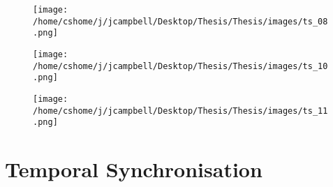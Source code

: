 
\begin{figure}[h]
\texttt{[image: /home/cshome/j/jcampbell/Desktop/Thesis/Thesis/images/ts\_08.png]}
\caption{\label{ts_08}}
\end{figure}


\begin{figure}[h]
\texttt{[image: /home/cshome/j/jcampbell/Desktop/Thesis/Thesis/images/ts\_10.png]}
\caption{\label{ts_10}}
\end{figure}

\begin{figure}[h]
\texttt{[image: /home/cshome/j/jcampbell/Desktop/Thesis/Thesis/images/ts\_11.png]}
\caption{\label{ts_11}}
\end{figure}




























\section{Temporal Synchronisation}

